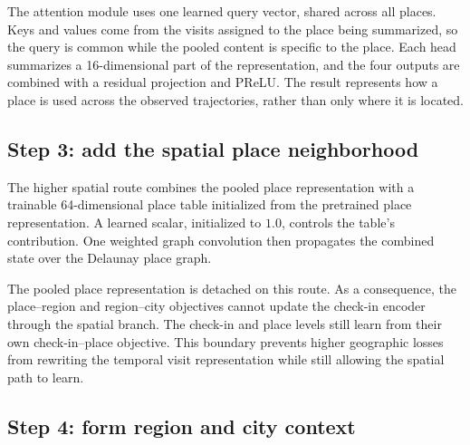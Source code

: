 The attention module uses one learned query vector, shared across all places. Keys
and values come from the visits assigned to the place being summarized, so the query
is common while the pooled content is specific to the place. Each head summarizes a 16-dimensional
part of the representation, and the four outputs are combined with a residual
projection and PReLU. The result represents how a place is used across the observed
trajectories, rather than only where it is located.

\subsection{Step 3: add the spatial place neighborhood}

The higher spatial route combines the pooled place representation with a trainable
64-dimensional place table initialized from the pretrained place representation.
A learned scalar, initialized to $1.0$, controls the table's contribution. One
weighted graph convolution then propagates the combined state over the Delaunay
place graph.

The pooled place representation is detached on this route. As a consequence, the
place--region and region--city objectives cannot update the check-in encoder through
the spatial branch. The check-in and place levels still learn from their own
check-in--place objective. This boundary prevents higher geographic losses from
rewriting the temporal visit representation while still allowing the spatial path
to learn.

\subsection{Step 4: form region and city context}

